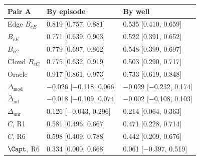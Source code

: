 \begin{tabular}{@{}l l l@{}}
\toprule
Pair A & By episode & By well \\
\midrule
Edge $B_{eE}$ & 0.819 [0.757, 0.881] & 0.535 [0.410, 0.659] \\
$B_{cE}$ & 0.771 [0.639, 0.903] & 0.522 [0.391, 0.652] \\
$B_{eC}$ & 0.779 [0.697, 0.862] & 0.548 [0.399, 0.697] \\
Cloud $B_{cC}$ & 0.775 [0.632, 0.919] & 0.503 [0.290, 0.717] \\
Oracle & 0.917 [0.861, 0.973] & 0.733 [0.619, 0.848] \\
$\bar\Delta_{\mathrm{mod}}$ & $-$0.026 [$-$0.118, 0.066] & $-$0.029 [$-$0.232, 0.174] \\
$\bar\Delta_{\mathrm{inf}}$ & $-$0.018 [$-$0.109, 0.074] & $-$0.002 [$-$0.108, 0.103] \\
$\Delta_{\mathrm{unr}}$ & 0.126 [$-$0.043, 0.296] & 0.214 [0.064, 0.363] \\
$C$, R1 & 0.581 [0.496, 0.667] & 0.471 [0.228, 0.714] \\
$C$, R6 & 0.598 [0.409, 0.788] & 0.442 [0.209, 0.676] \\
$\Capt$, R6 & 0.334 [0.000, 0.668] & 0.061 [$-$0.397, 0.519] \\
\bottomrule
\end{tabular}
